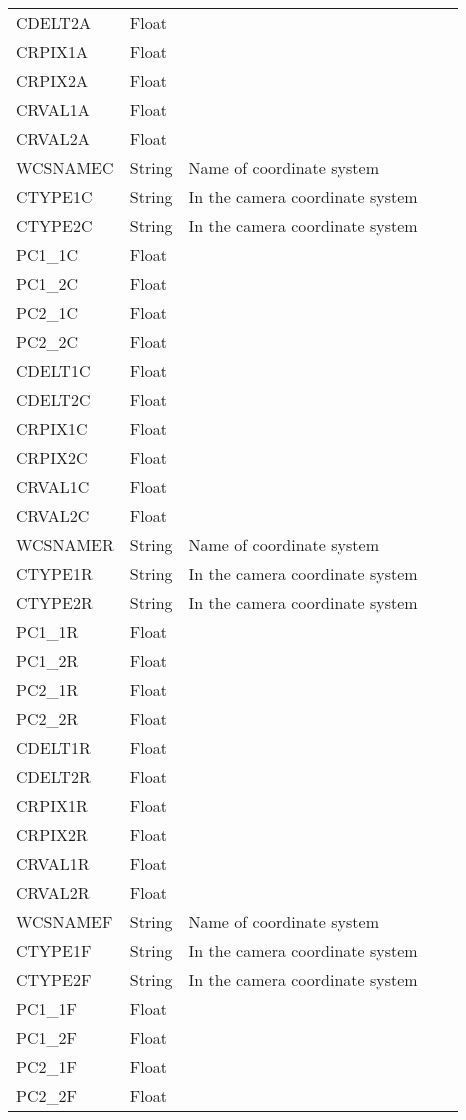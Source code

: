 \begin{tabular}{l l l l l}
CDELT2A & Float &  \\
CRPIX1A & Float &  \\
CRPIX2A & Float &  \\
CRVAL1A & Float &  \\
CRVAL2A & Float &  \\
WCSNAMEC & String & Name of coordinate system \\
CTYPE1C & String & In the camera coordinate system \\
CTYPE2C & String & In the camera coordinate system \\
PC1\_1C & Float &  \\
PC1\_2C & Float &  \\
PC2\_1C & Float &  \\
PC2\_2C & Float &  \\
CDELT1C & Float &  \\
CDELT2C & Float &  \\
CRPIX1C & Float &  \\
CRPIX2C & Float &  \\
CRVAL1C & Float &  \\
CRVAL2C & Float &  \\
WCSNAMER & String & Name of coordinate system \\
CTYPE1R & String & In the camera coordinate system \\
CTYPE2R & String & In the camera coordinate system \\
PC1\_1R & Float &  \\
PC1\_2R & Float &  \\
PC2\_1R & Float &  \\
PC2\_2R & Float &  \\
CDELT1R & Float &  \\
CDELT2R & Float &  \\
CRPIX1R & Float &  \\
CRPIX2R & Float &  \\
CRVAL1R & Float &  \\
CRVAL2R & Float &  \\
WCSNAMEF & String & Name of coordinate system \\
CTYPE1F & String & In the camera coordinate system \\
CTYPE2F & String & In the camera coordinate system \\
PC1\_1F & Float &  \\
PC1\_2F & Float &  \\
PC2\_1F & Float &  \\
PC2\_2F & Float &  \\

\end{tabular}
